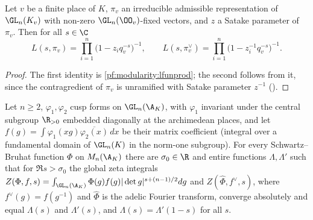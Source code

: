 \begin{theorem}\label{pf:modularity:locUnr}
Let $v$ be a finite place of $K$, $\pi_v$ an irreducible admissible representation of $\GL_n(K_v)$ with non-zero
$\GL_n(\OO_v)$-fixed vectors, and $z$ a Satake parameter of $\pi_v$. Then for all $s\in\C$
\[
 L(s,\pi_v)=\prod_{i=1}^n\bigl(1-z_iq_v^{-s}\bigr)^{-1},\qquad L(s,\pi_v^\vee)=\prod_{i=1}^n\bigl(1-z_i^{-1}q_v^{-s}\bigr)^{-1}.
\]
\end{theorem}

\begin{proof}
The first identity is \cref{pf:modularity:lfunprod}; the second follows from it, since the contragredient of $\pi_v$ is
unramified with Satake parameter $z^{-1}$ ().
\end{proof}

\begin{littheorem}\label{pf:modularity:GJglobal}
Let $n\ge2$, $\varphi_1,\varphi_2$ cusp forms on $\GL_n(\A_K)$, with $\varphi_1$ invariant under the central subgroup
$\R_{>0}$ embedded diagonally at the archimedean places, and let
$f(g)=\int\varphi_1(xg)\overline{\varphi_2(x)}\,dx$ be their matrix coefficient (integral over a fundamental domain of
$\GL_n(K)$ in the norm-one subgroup). For every Schwartz--Bruhat function $\Phi$ on $M_n(\A_K)$ there are $\sigma_0\in\R$
and entire functions $\Lambda,\Lambda'$ such that for $\Re s>\sigma_0$ the global zeta integrals
$Z(\Phi,f,s)=\int_{\GL_n(\A_K)}\Phi(g)f(g)|\det g|^{s+(n-1)/2}dg$ and $Z(\widehat\Phi,f^\vee,s)$, where
$f^\vee(g)=f(g^{-1})$ and $\widehat\Phi$ is the adelic Fourier transform, converge absolutely and equal $\Lambda(s)$ and
$\Lambda'(s)$, and $\Lambda(s)=\Lambda'(1-s)$ for all $s$.
\end{littheorem}

